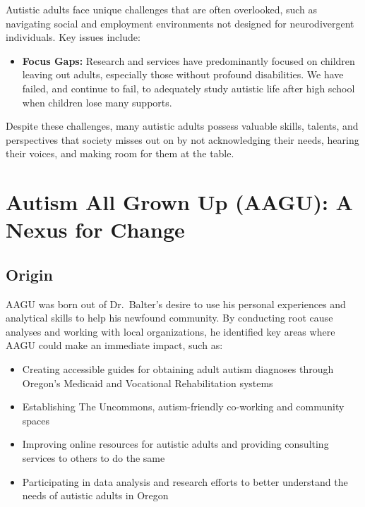 \documentclass[
  letterpaper,
  DIV=11,
  numbers=noendperiod]{scrreprt}
\providecommand{\tightlist}{%
  \setlength{\itemsep}{0pt}\setlength{\parskip}{0pt}}\usepackage{longtable,booktabs,array}
\begin{document}
Autistic adults face unique challenges that are often overlooked, such
as navigating social and employment environments not designed for
neurodivergent individuals. Key issues include:

\begin{itemize}
\tightlist
\item
  \textbf{Focus Gaps:} Research and services have predominantly focused
  on children leaving out adults, especially those without profound
  disabilities. We have failed, and continue to fail, to adequately
  study autistic life after high school when children lose many
  supports.
\end{itemize}

Despite these challenges, many autistic adults possess valuable skills,
talents, and perspectives that society misses out on by not
acknowledging their needs, hearing their voices, and making room for
them at the table.


\hypertarget{sec-aagu}{%
\chapter{Autism All Grown Up (AAGU): A Nexus for
Change}\label{sec-aagu}}

\hypertarget{sec-aagu_origin}{%
\section{Origin}\label{sec-aagu_origin}}

AAGU was born out of Dr.~Balter's desire to use his personal experiences
and analytical skills to help his newfound community. By conducting root
cause analyses and working with local organizations, he identified key
areas where AAGU could make an immediate impact, such as:

\begin{itemize}
\tightlist
\item
  Creating accessible guides for obtaining adult autism diagnoses
  through Oregon's Medicaid and Vocational Rehabilitation systems
\item
  Establishing The Uncommons, autism-friendly co-working and community
  spaces
\item
  Improving online resources for autistic adults and providing
  consulting services to others to do the same
\item
  Participating in data analysis and research efforts to better
  understand the needs of autistic adults in Oregon
\end{itemize}
\end{document}
